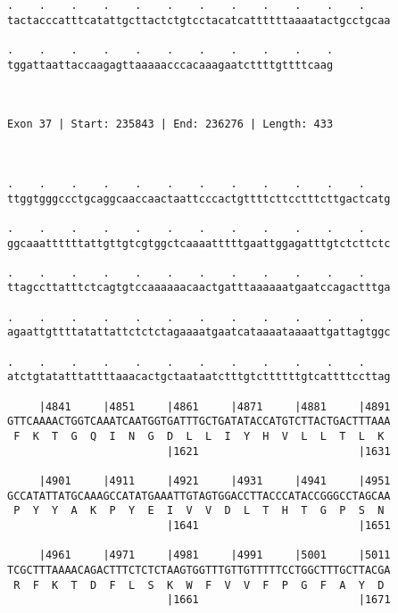 \documentclass{article}
\begin{document}
\begin{Verbatim}
.    .    .    .    .    .    .    .    .    .    .    .    
tactacccatttcatattgcttactctgtcctacatcattttttaaaatactgcctgcaa
                                                            
.    .    .    .    .    .    .    .    .    .    .
tggattaattaccaagagttaaaaacccacaaagaatcttttgttttcaag
                                                   
                                                   
 
Exon 37 | Start: 235843 | End: 236276 | Length: 433



.    .    .    .    .    .    .    .    .    .    .    .    
ttggtgggccctgcaggcaaccaactaattcccactgttttcttcctttcttgactcatg
                                                            
.    .    .    .    .    .    .    .    .    .    .    .    
ggcaaattttttattgttgtcgtggctcaaaatttttgaattggagatttgtctcttctc
                                                            
.    .    .    .    .    .    .    .    .    .    .    .    
ttagccttatttctcagtgtccaaaaaacaactgatttaaaaaatgaatccagactttga
                                                            
.    .    .    .    .    .    .    .    .    .    .    .    
agaattgttttatattattctctctagaaaatgaatcataaaataaaattgattagtggc
                                                            
.    .    .    .    .    .    .    .    .    .    .    .    
atctgtatatttattttaaacactgctaataatctttgtcttttttgtcattttccttag
                                                            
     |4841     |4851     |4861     |4871     |4881     |4891
GTTCAAAACTGGTCAAATCAATGGTGATTTGCTGATATACCATGTCTTACTGACTTTAAA
 F  K  T  G  Q  I  N  G  D  L  L  I  Y  H  V  L  L  T  L  K 
                         |1621                         |1631
  
     |4901     |4911     |4921     |4931     |4941     |4951
GCCATATTATGCAAAGCCATATGAAATTGTAGTGGACCTTACCCATACCGGGCCTAGCAA
 P  Y  Y  A  K  P  Y  E  I  V  V  D  L  T  H  T  G  P  S  N 
                         |1641                         |1651
  
     |4961     |4971     |4981     |4991     |5001     |5011
TCGCTTTAAAACAGACTTTCTCTCTAAGTGGTTTGTTGTTTTTCCTGGCTTTGCTTACGA
 R  F  K  T  D  F  L  S  K  W  F  V  V  F  P  G  F  A  Y  D 
                         |1661                         |1671
  

\end{Verbatim}
\end{document}

